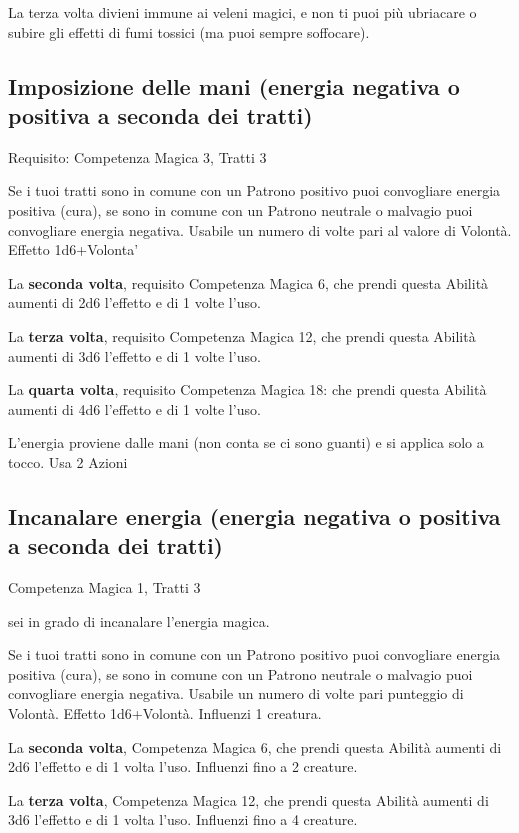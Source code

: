 \documentclass[a4paper,11pt,twoside,openany]{book}
\begin{document}
La terza volta divieni immune ai veleni magici, e non ti puoi più ubriacare o subire gli effetti di fumi tossici (ma puoi sempre soffocare).

\subsection{Imposizione delle mani (energia negativa o positiva a seconda dei tratti)}

Requisito: Competenza Magica 3, Tratti 3

Se i tuoi tratti sono in comune con un Patrono positivo puoi convogliare energia positiva (cura), se sono in comune con un Patrono neutrale o malvagio puoi convogliare energia negativa. Usabile un numero di volte pari al valore di Volontà. Effetto 1d6+Volonta'

La \textbf{seconda volta}, requisito Competenza Magica 6, che prendi questa Abilità aumenti di 2d6 l'effetto e di 1 volte l'uso.

La \textbf{terza volta}, requisito Competenza Magica 12, che prendi questa Abilità aumenti di 3d6 l'effetto e di 1 volte l'uso.

La \textbf{quarta volta}, requisito Competenza Magica 18: che prendi questa Abilità aumenti di 4d6 l'effetto e di 1 volte l'uso.

L'energia proviene dalle mani (non conta se ci sono guanti) e si applica solo a tocco. Usa 2 Azioni

\subsection{Incanalare energia (energia negativa o positiva a seconda dei tratti)}

Competenza Magica 1, Tratti 3

sei in grado di incanalare l'energia magica.

Se i tuoi tratti sono in comune con un Patrono positivo puoi convogliare energia positiva (cura), se sono in comune con un Patrono neutrale o malvagio puoi convogliare energia negativa. Usabile un numero di volte pari punteggio di Volontà. Effetto 1d6+Volontà. Influenzi 1 creatura.

La \textbf{seconda volta}, Competenza Magica 6, che prendi questa Abilità aumenti di 2d6 l'effetto e di 1 volta l'uso. Influenzi fino a 2 creature.

La \textbf{terza volta}, Competenza Magica 12, che prendi questa Abilità aumenti di 3d6 l'effetto e di 1 volta l'uso. Influenzi fino a 4 creature.
\end{document}
